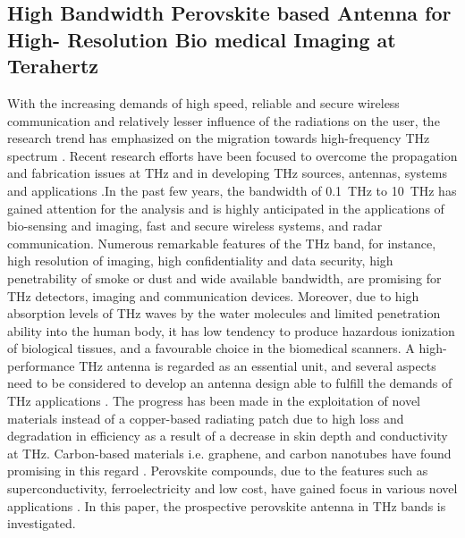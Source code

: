 \documentclass[12pt]{suhbook}
\begin{document}
\subsection{High Bandwidth Perovskite based Antenna for High- Resolution Bio medical Imaging at Terahertz}
% 
 With the increasing demands of high speed, reliable and secure wireless communication and relatively lesser influence of the radiations on the user, the research trend has emphasized on the migration towards high-frequency THz spectrum \cite{ghann2017terahertz}\cite{rabbani2017liquid}. Recent research efforts have been focused to overcome the propagation and fabrication issues at THz and in developing THz sources, antennas, systems and applications \cite{siegel2002terahertz}.In the past few years, the bandwidth of \SI{0.1}{\THz} to \SI{10}{\THz} has gained attention for the analysis and is highly anticipated in the applications of bio-sensing and imaging, fast and secure wireless systems, and radar communication\cite{ranzani2013g}\cite{khatib2018response}. Numerous remarkable features of the THz band, for instance, high resolution of imaging, high confidentiality and data security, high penetrability of smoke or dust and wide available bandwidth, are promising for THz detectors, imaging and communication devices. Moreover, due to high absorption levels of THz waves by the water molecules and limited penetration ability into the human body, it has low tendency to produce hazardous ionization of biological tissues, and a favourable choice in the biomedical scanners. A high-performance THz antenna is regarded as an essential unit, and several aspects need to be considered to develop an antenna design able to fulfill the demands of THz applications \cite{chen2016research}. The progress has been made in the exploitation of novel materials instead of a copper-based radiating patch due to high loss and degradation in efficiency as a result of a decrease in skin depth and conductivity at THz. Carbon-based materials i.e. graphene, and carbon nanotubes have found promising in this regard \cite{naghdehforushha2017design}. Perovskite compounds, due to the features such as superconductivity, ferroelectricity and low cost, have gained focus in various novel applications \cite{huang2014low}. In this paper, the prospective perovskite antenna in THz bands is investigated.
\end{document}
